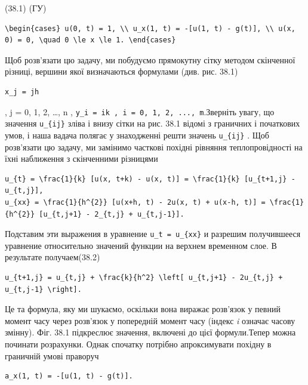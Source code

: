 \documentclass[
  ukrainian,
]{article}
\begin{document}
(38.1) (ГУ)

\begin{verbatim}
\begin{cases} u(0, t) = 1, \\ u_x(1, t) = -[u(1, t) - g(t)], \\ u(x, 0) = 0, \quad 0 \le x \le 1. \end{cases}
\end{verbatim}

Щоб розв'язати цю задачу, ми побудуємо прямокутну сітку методом
скінченної різниці, вершини якої визначаються формулами (див. рис. 38.1)

\begin{verbatim}
x_j = jh
\end{verbatim}

, j = 0, 1, 2, \ldots, n ,
\texttt{y\_i\ =\ ik\ ,\ i\ =\ 0,\ 1,\ 2,\ ...,\ m}.Зверніть увагу, що
значення \texttt{u\_\{ij\}} зліва і внизу сітки на рис. 38.1 відомі з
граничних і початкових умов, і наша вадача полягає у знаходженні решти
значень \texttt{u\_\{ij\}} . Щоб розв'язати цю задачу, ми замінимо
часткові похідні рівняння теплопровідності на їхні наближення з
скінченними різницями

\begin{verbatim}
u_{t} = \frac{1}{k} [u(x, t+k) - u(x, t)] = \frac{1}{k} [u_{t+1,j} - u_{t,j}],
u_{xx} = \frac{1}{h^{2}} [u(x+h, t) - 2u(x, t) + u(x-h, t)] = \frac{1}{h^{2}} [u_{t,j+1} - 2_{t,j} + u_{t,j-1}].
\end{verbatim}

Подставим эти выражения в уравнение \texttt{u\_t\ =\ u\_\{xx\}} и
разрешим получившееся уравнение относительно значений функции на верхнем
временном слое. В результате получаем(38.2)

\begin{verbatim}
u_{t+1,j} = u_{t,j} + \frac{k}{h^2} \left[ u_{t,j+1} - 2u_{t,j} + u_{t,j-1} \right].
\end{verbatim}

Це та формула, яку ми шукаємо, оскільки вона виражає розв'язок у певний
момент часу через розв'язок у попередній момент часу (індекс \emph{i}
означає часову змінну). Фіг. 38.1 підкреслює значення, включені до цієї
формули.Тепер можна починати розрахунки. Однак спочатку потрібно
апроксимувати похідну в граничній умові праворуч

\begin{verbatim}
a_x(1, t) = -[u(1, t) - g(t)].
\end{verbatim}
\end{document}

